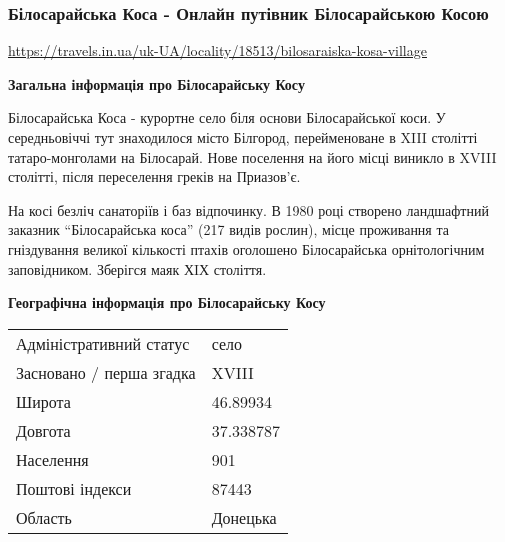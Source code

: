  
 
 
 
 

\subsubsection{Білосарайська Коса - Онлайн путівник Білосарайською Косою}

\url{https://travels.in.ua/uk-UA/locality/18513/bilosaraiska-kosa-village}


\textbf{Загальна інформація про Білосарайську Косу}

Білосарайська Коса - курортне село біля основи Білосарайської коси. У
середньовіччі тут знаходилося місто Білгород, перейменоване в XIII столітті
татаро-монголами на Білосарай. Нове поселення на його місці виникло в XVIII
столітті, після переселення греків на Приазов'є.

На косі безліч санаторіїв і баз відпочинку. В 1980 році створено ландшафтний
заказник \enquote{Білосарайська коса} (217 видів рослин), місце проживання та
гніздування великої кількості птахів оголошено Білосарайська орнітологічним
заповідником. Зберігся маяк ХIХ століття.

\textbf{Географічна інформація про Білосарайську Косу}

\begin{tabular}{ll}
Адміністративний статус  & село\\
Засновано / перша згадка & XVIII\\
Широта                   & 46.89934\\
Довгота                  & 37.338787\\
Населення                & 901\\
Поштові індекси          & 87443\\
Область                  & Донецька\\
\end{tabular}
